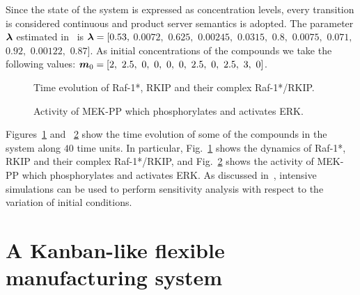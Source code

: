 Since the state of the system is expressed as concentration levels, every transition
is considered continuous and product server semantics is adopted. The parameter
$\b{\lambda}$ estimated in~\cite{IPChShKi03} is
$\b{\lambda}= [0.53,$ $0.0072,$ $0.625,$ $0.00245,$ $0.0315,$ $0.8,$ $0.0075,$ $0.071,$ $0.92,$ $0.00122,$ $0.87]$.
As initial concentrations of the compounds we take the following values:
$\mo=[2,\ 2.5,\ 0,\ 0,\ 0,\ 0,\ 2.5,\ 0,\ 2.5,\ 3,\ 0]$.

\begin{figure}
   \caption{Time evolution of Raf-1*, RKIP and their complex Raf-1*/RKIP.}
   \label{f-mf1c1}
\end{figure}

\begin{figure}
   \caption{Activity of MEK-PP which phosphorylates and activates ERK.}
   \label{f-mf1c2}
\end{figure}

Figures~\ref{f-mf1c1} and ~\ref{f-mf1c2} show the time evolution of some
of the compounds in the system along $40$ time units. In particular, Fig.~\ref{f-mf1c1}
shows the dynamics of Raf-1*, RKIP and their complex Raf-1*/RKIP, and
Fig.~\ref{f-mf1c2} shows the activity of MEK-PP which phosphorylates and activates ERK.
As discussed in~\cite{IPChShKi03}, intensive simulations can be used to
perform sensitivity analysis with respect to the variation of initial conditions.





\section{A Kanban-like flexible manufacturing system}


